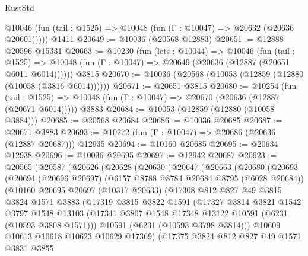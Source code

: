 \begin{lexlean}{RustStd}
\begin{coremodule}
{{      @10046 (fun (tail : @1525) => @10048 (fun (Γ : @10047) => @20632 (@20636 @20601)))))
    @1411
@20649 := @10036 (@20568 @12883)
@20651 := @12888 @20596 @15331
@20663 := @10230
    (fun (lets : @10044) =>
    @10046
      (fun (tail : @1525) =>
      @10048 (fun (Γ : @10047) => @20649 (@20636 (@12887 (@20651 @6011 @6014))))))
    @3815
@20670 := @10036 (@20568 (@10053 (@12859 (@12880 (@10058 (@3816 @6014))))))
@20671 := @20651 @3815
@20680 := @10254
    (fun (tail : @1525) => @10048 (fun (Γ : @10047) => @20670 (@20636 (@12887 (@20671 @6014)))))
    @3883
@20684 := @10053 (@12859 (@12880 (@10058 @3884)))
@20685 := @20568 @20684
@20686 := @10036 @20685
@20687 := @20671 @3883
@20693 := @10272 (fun (Γ : @10047) => @20686 (@20636 (@12887 @20687))) @12935
@20694 := @10160 @20685
@20695 := @20634 @12938
@20696 := @10036 @20695
@20697 := @12942 @20687
@20923 := @20565
    (@20587
      (@20626
        (@20628
          (@20630
            (@20647
              (@20663
                (@20680
                  (@20693
                    (@20694
                      (@20696 @20697)
                      (@6157 @8788 @8784 @20684 @8795 (@6028 @20684))
                      (@10160
                        @20695
                        @20697
                        (@10317 @20633)
                        (@17308
                          @812
                          @827
                          @49
                          @3815
                          @3824
                          @1571
                          @3883
                          (@17319
                            @3815
                            @3822
                            @1591
                            (@17327
                              @3814
                              @3821
                              @1542
                              @3797
                              @1548
                              @13103
                              (@17341 @3807 @1548 @17348 @13122 @10591 (@6231 (@10593 @3808 @1571)))
                              @10591
                              (@6231 (@10593 @3798 @3814)))
                            @10609
                            @10613
                            @10618
                            @10623
                            @10629
                            @17369)
                          (@17375
                            @3824
                            @812
                            @827
                            @49
                            @1571
                            @3831
                            @3855
}}
\end{coremodule}
\end{lexlean}
